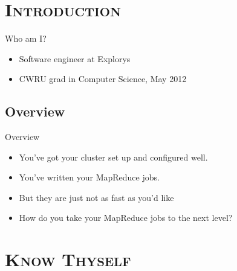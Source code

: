 \documentclass[xcolor=x11names,compress]{beamer}
\renewcommand{\(}{\begin{columns}}
\renewcommand{\)}{\end{columns}}
\newcommand{\<}[1]{\begin{column}{#1}}
\renewcommand{\>}{\end{column}}
\begin{document}
\section{\scshape Introduction}

\begin{frame}{Who am I?}
  \begin{itemize}
  \item Software engineer at Explorys
  \item CWRU grad in Computer Science, May 2012
  \end{itemize}
\end{frame}

\subsection{Overview}

\begin{frame}{Overview}
  \begin{itemize}
  \item<1,2,3> You've got your cluster set up and configured well.
  \item<2,3> You've written your MapReduce jobs.
  \item<3> But they are just not as fast as you'd like
  \item<4> How do you take your MapReduce jobs to the next level?
  \end{itemize}
\end{frame}

\section{\scshape Know Thyself}
\end{document}
